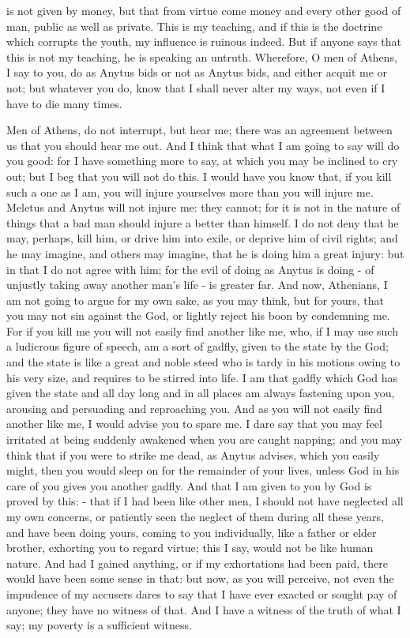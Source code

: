\documentclass[11pt]{article}
\begin{document}
is not given by money, but that from virtue come money and every other good of man, public as well as private. This is my teaching, and if this is the doctrine which corrupts the youth, my influence is ruinous indeed. But if anyone says that this is not my teaching, he is speaking an untruth. Wherefore, O men of Athens, I say to you, do as Anytus bids or not as Anytus bids, and either acquit me or not; but whatever you do, know that I shall never alter my ways, not even if I have to die many times.

Men of Athens, do not interrupt, but hear me; there was an agreement between us that you should hear me out. And I think that what I am going to say will do you good: for I have something more to say, at which you may be inclined to cry out; but I beg that you will not do this. I would have you know that, if you kill such a one as I am, you will injure yourselves more than you will injure me. Meletus and Anytus will not injure me: they cannot; for it is not in the nature of things that a bad man should injure a better than himself. I do not deny that he may, perhaps, kill him, or drive him into exile, or deprive him of civil rights; and he may imagine, and others may imagine, that he is doing him a great injury: but in that I do not agree with him; for the evil of doing as Anytus is doing - of unjustly taking away another man's life - is greater far. And now, Athenians, I am not going to argue for my own sake, as you may think, but for yours, that you may not sin against the God, or lightly reject his boon by condemning me. For if you kill me you will not easily find another like me, who, if I may use such a ludicrous figure of speech, am a sort of gadfly, given to the state by the God; and the state is like a great and noble steed who is tardy in his motions owing to his very size, and requires to be stirred into life. I am that gadfly which God has given the state and all day long and in all places am always fastening upon you, arousing and persuading and reproaching you. And as you will not easily find another like me, I would advise you to spare me. I dare say that you may feel irritated at being suddenly awakened when you are caught napping; and you may think that if you were to strike me dead, as Anytus advises, which you easily might, then you would sleep on for the remainder of your lives, unless God in his care of you gives you another gadfly. And that I am given to you by God is proved by this: - that if I had been like other men, I should not have neglected all my own concerns, or patiently seen the neglect of them during all these years, and have been doing yours, coming to you individually, like a father or elder brother, exhorting you to regard virtue; this I say, would not be like human nature. And had I gained anything, or if my exhortations had been paid, there would have been some sense in that: but now, as you will perceive, not even the impudence of my accusers dares to say that I have ever exacted or sought pay of anyone; they have no witness of that. And I have a witness of the truth of what I say; my poverty is a sufficient witness.
\end{document}
